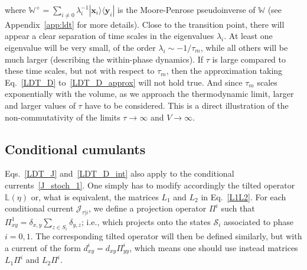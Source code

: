 \documentclass[aps,pre,reprint, amsmath, amssymb,superscriptaddress]{revtex4-1}
\begin{document}
where $\mathbb{W}^+ = \sum_{i\neq 0} \lambda_i^{-1} |\bm{x}_i\rangle\langle \bm{y}_i|$ is the Moore-Penrose pseudoinverse of $\mathbb{W}$ (see Appendix~\ref{app:ldt} for more details).
Close to the transition point, there will appear a clear separation of time scales in the eigenvalues $\lambda_i$. 
At least one eigenvalue will be very small, of the order $\lambda_i \sim -1/\tau_m$, while all others will be much larger (describing the within-phase dynamics). 
If $\tau$ is large compared to these time scales, but not with respect to $\tau_m$, then 
the approximation taking Eq.~\eqref{LDT_D} to~\eqref{LDT_D_approx} will not hold true.
And since $\tau_m$ scales exponentially with the volume, as we approach the thermodynamic limit, larger and larger values of $\tau$ have to be considered.
This is a direct illustration of the non-commutativity of the limits $\tau \to \infty$ and $V\to\infty$.

\subsection{Conditional cumulants}

Eqs.~\eqref{LDT_J} and~\eqref{LDT_D_int} also apply to the conditional currents~\eqref{J_stoch_1}. 
One simply has to modify accordingly the tilted operator $\mathbb{L}(\eta)$ or, what is equivalent, the matrices $L_1$ and $L_2$ in Eq.~\eqref{L1L2}.
For each conditional current  $\mathcal{J}_{\tau|i}$, 
we  define a projection operator $\Pi^i$ such that $\Pi_{xy}^1 = \delta_{x,y} \sum_{z\in S_i} \delta_{y,z}$; i.e., which projects onto the states $\mathcal{S}_i$ associated to phase $i = 0,1$. 
The corresponding tilted operator will then be defined similarly, but with a current of the form $d_{xy}^i = d_{xy} \Pi_{yy}^i$, which means one should use instead  matrices $L_1 \Pi^i$ and $L_2 \Pi^i$. 
\end{document}
